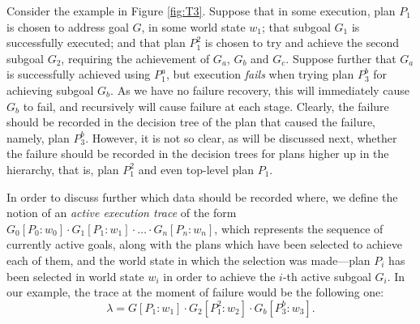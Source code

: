 Consider the example in Figure \ref{fig:T3}. 
%
Suppose that in some execution, plan $P_1$ is chosen to address goal $G$, in some world state $w_1$;
that subgoal $G_1$ is successfully executed; and that plan $P_1^2$ is chosen to try and achieve
the second subgoal $G_2$, requiring the achievement of $G_a$, $G_b$ and $G_c$.
%
Suppose further that $G_a$ is successfully achieved using $P_1^a$, but execution \emph{fails}
when trying plan $P_3^b$ for achieving subgoal $G_b$.  As we have no failure recovery, this will
immediately cause $G_b$ to fail, and recursively will cause failure at each stage. 
%
Clearly, the failure should be recorded in the decision tree of the plan that caused the
failure, namely, plan $P_3^b$. However, it is not so clear, as will be discussed next, whether the
failure should be recorded in the decision trees for plans higher up in the hierarchy, that is,
plan $P_1^2$ and even top-level plan $P_1$.



In order to discuss further which data should be recorded where, we
define the notion of an \textit{active execution trace} of the form
$G_0[P_0:w_0] \cdot G_1[P_1:w_1] \cdot \ldots \cdot G_n[P_n:w_n]$, which
represents the sequence of currently active goals, along with the plans which 
have been selected to achieve each of them, and the world state in which the selection 
was made---plan $P_i$ has been selected in world state $w_i$ in order to achieve the $i$-th
active subgoal $G_i$.
%
In our example, the trace at the moment of failure would be the following one:
\[
\lambda=G[P_1:w_1] \cdot G_2[P_1^2:w_2] \cdot G_b[P_3^b:w_3].
\]


